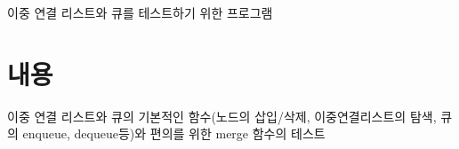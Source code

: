 이중 연결 리스트와 큐를 테스트하기 위한 프로그램 \hypertarget{index_intro_sec}{}\section{내용}\label{index_intro_sec}
이중 연결 리스트와 큐의 기본적인 함수(노드의 삽입/삭제, 이중연결리스트의 탐색, 큐의 enqueue, dequeue등)와 편의를 위한 merge 함수의 테스트 